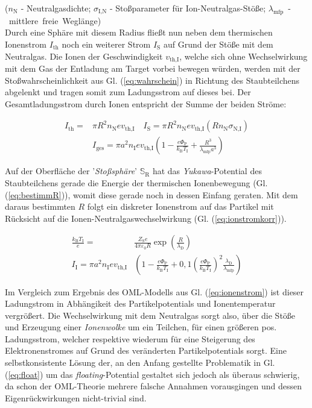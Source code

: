 \documentclass[numbers=noenddot,a4paper]{scrartcl}
\newcommand{\ix}[1]{_\text{#1}}
\newcommand{\tilt}[1]{\textit{#1}}
\begin{document}
		($n\ix{N}$ - Neutralgasdichte; $\sigma\ix{I,N}$ - Stoßparameter für Ion-Neutralgas-Stöße; \mbox{$\lambda\ix{mfp}$ - mittlere freie Wegl\"ange})\\
		Durch eine Sph\"are mit diesem Radius flie{\ss}t nun neben dem thermischen Ionenstrom $I\ix{th}$ noch ein weiterer Strom $I\ix{S}$ auf Grund der St\"o{\ss}e mit dem Neutralgas. Die Ionen der Geschwindigkeit $v\ix{th,I}$, welche sich ohne Wechselwirkung mit dem Gas der Entladung am Target vorbei bewegen w\"urden, werden mit der Sto{\ss}wahrscheinlichkeit aus Gl. (\ref{eq:wahrschein}) in Richtung des Staubteilchens abgelenkt und tragen somit zum Ladungsstrom auf dieses bei. Der Gesamtladungsstrom durch Ionen entspricht der Summe der beiden Str\"ome:
		
			\begin{align}
				I\ix{th}=&\pi R^{2}n\ix{N}ev\ix{th,I} \quad I\ix{S}=\pi R^2n\ix{N}ev\ix{th,I}\left(Rn\ix{N}\sigma\ix{N,I}\right) \\
				&I\ix{ges}=\pi a^{2}n\ix{I}ev\ix{th,I}\left(1-\frac{e\Phi\ix{P}}{k\ix{B}T\ix{I}}+\frac{R^{3}}{\lambda\ix{mfp}a^{3}}\right)
			\end{align}
	
		Auf der Oberfl\"ache der '\tilt{Sto{\ss}sph\"are}' $\mathbb{S}\ix{R}$ hat das \tilt{Yukawa}-Potential des Staubteilchens gerade die Energie der thermischen Ionenbewegung (Gl. (\ref{eq:bestimmR})), womit diese gerade noch in dessen Einfang geraten. Mit dem daraus bestimmten $R$ folgt ein diskreter Ionenstrom auf das Partikel mit R\"ucksicht auf die Ionen-Neutralgaswechselwirkung (Gl. (\ref{eq:ionstromkorr})).
		
			\begin{align}
				\frac{k\ix{B}T\ix{I}}{e}=&\frac{Z\ix{S}e}{4\pi\varepsilon\ix{0}R}\exp\left(\frac{R}{\lambda\ix{D}}\right) \label{eq:bestimmR} \\
				I\ix{I}=\pi a^{2} n\ix{I}e v\ix{th,I}&\left(1-\frac{e\Phi\ix{P}}{k\ix{B}T\ix{I}}+0,1\left(\frac{e\Phi\ix{P}}{k\ix{B}T\ix{I}}\right)^{2}\frac{\lambda\ix{D}}{\lambda\ix{mfp}}\right) \label{eq:ionstromkorr}
			\end{align}
			
		Im Vergleich zum Ergebnis des OML-Modells aus Gl. (\ref{eq:ionenstrom}) ist dieser Ladungstrom in Abh\"angikeit des Partikelpotentials und Ionentemperatur vergr\"o{\ss}ert. Die Wechselwirkung mit dem Neutralgas sorgt also, \"uber die St\"o{\ss}e und Erzeugung einer \tilt{Ionenwolke} um ein Teilchen, f\"ur einen gr\"o{\ss}eren pos. Ladungsstrom, welcher respektive wiederum f\"ur eine Steigerung des Elektronenstromes auf Grund des ver\"anderten Partikelpotentials sorgt. Eine selbstkonsistente L\"osung der, an den Anfang gestellte Problematik in Gl. (\ref{eq:float}) um das \tilt{floating}-Potential gestaltet sich jedoch als \"uberaus schwierig, da schon der OML-Theorie mehrere falsche Annahmen vorausgingen und dessen Eigenr\"uckwirkungen nicht-trivial sind.
			
\end{document}

